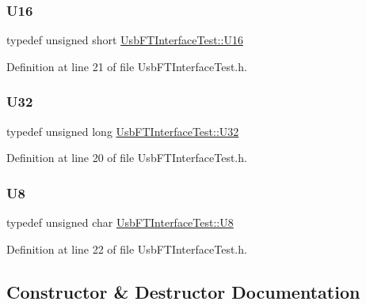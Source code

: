 \subsubsection{\texorpdfstring{U16}{U16}}
{\footnotesize\ttfamily typedef unsigned short \hyperlink{classUsbFTInterfaceTest_ab034b25c13b6c84815e5858d292d7635}{Usb\+F\+T\+Interface\+Test\+::\+U16}}



Definition at line 21 of file Usb\+F\+T\+Interface\+Test.\+h.

\mbox{\label{classUsbFTInterfaceTest_a7e1ea68fb6c72d6c994cc0699b0780a3}} 
\subsubsection{\texorpdfstring{U32}{U32}}
{\footnotesize\ttfamily typedef unsigned long \hyperlink{classUsbFTInterfaceTest_a7e1ea68fb6c72d6c994cc0699b0780a3}{Usb\+F\+T\+Interface\+Test\+::\+U32}}



Definition at line 20 of file Usb\+F\+T\+Interface\+Test.\+h.

\mbox{\label{classUsbFTInterfaceTest_ac12634d25ee35ceb35c76ec3a4c5c47f}} 
\subsubsection{\texorpdfstring{U8}{U8}}
{\footnotesize\ttfamily typedef unsigned char \hyperlink{classUsbFTInterfaceTest_ac12634d25ee35ceb35c76ec3a4c5c47f}{Usb\+F\+T\+Interface\+Test\+::\+U8}}



Definition at line 22 of file Usb\+F\+T\+Interface\+Test.\+h.



\subsection{Constructor \& Destructor Documentation}
\mbox{\label{classUsbFTInterfaceTest_ae83ca1c95a132a896f8c2c0d9a903add}} 
